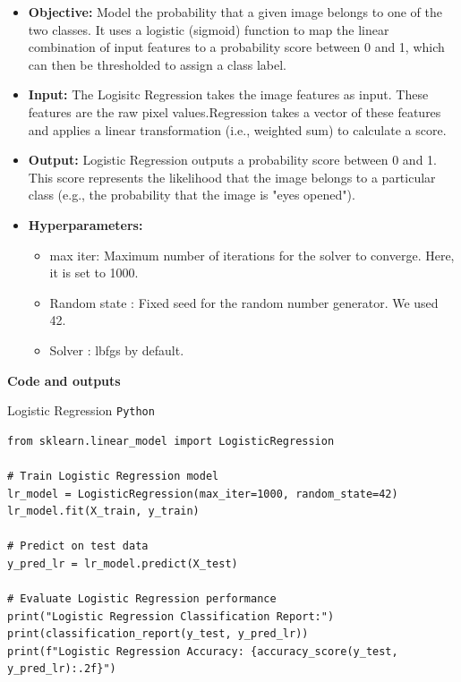 \documentclass{modeleRapport}
\begin{document}
\begin{itemize}
    \item \textbf{Objective:} Model the probability that a given image belongs to one of the two classes.
    It uses a logistic (sigmoid) function to map the linear combination of input features to a probability score between 0 and 1, which can then be thresholded to assign a class label.

    \item \textbf{Input:} The Logisitc Regression takes the image features as input. These features are the raw pixel values.Regression takes a vector of these features and applies a linear transformation (i.e., weighted sum) to calculate a score.

    \item \textbf{Output:} Logistic Regression outputs a probability score between 0 and 1. This score represents the likelihood that the image belongs to a particular class (e.g., the probability that the image is "eyes opened").

    \item \textbf{Hyperparameters:}
    \begin{itemize}
        \item max iter: Maximum number of iterations for the solver to converge. Here, it is set to 1000.
        \item Random state : Fixed seed for the random number generator. We used 42.
        \item Solver : lbfgs by default.
    \end{itemize}
   
\end{itemize}
\bigskip
\bigskip
\textbf{Code and outputs\\}
\begin{codebox}[LR Classifier]{Logistic Regression \texttt{Python}}
\begin{lstlisting}
from sklearn.linear_model import LogisticRegression

# Train Logistic Regression model
lr_model = LogisticRegression(max_iter=1000, random_state=42)
lr_model.fit(X_train, y_train)

# Predict on test data
y_pred_lr = lr_model.predict(X_test)

# Evaluate Logistic Regression performance
print("Logistic Regression Classification Report:")
print(classification_report(y_test, y_pred_lr))
print(f"Logistic Regression Accuracy: {accuracy_score(y_test, y_pred_lr):.2f}")
\end{lstlisting}
\end{codebox}
\end{document}
